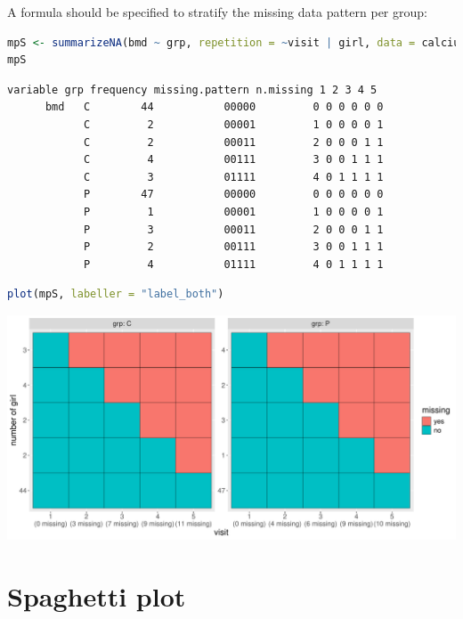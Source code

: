 \documentclass[12pt]{article}
\begin{document}
\clearpage

A formula should be specified to stratify the missing data pattern per group:
\begin{lstlisting}[language=r,numbers=none]
mpS <- summarizeNA(bmd ~ grp, repetition = ~visit | girl, data = calciumL)
mpS
\end{lstlisting}

\label{}
\begin{verbatim}
variable grp frequency missing.pattern n.missing 1 2 3 4 5
      bmd   C        44           00000         0 0 0 0 0 0
            C         2           00001         1 0 0 0 0 1
            C         2           00011         2 0 0 0 1 1
            C         4           00111         3 0 0 1 1 1
            C         3           01111         4 0 1 1 1 1
            P        47           00000         0 0 0 0 0 0
            P         1           00001         1 0 0 0 0 1
            P         3           00011         2 0 0 0 1 1
            P         2           00111         3 0 0 1 1 1
            P         4           01111         4 0 1 1 1 1
\end{verbatim}

\begin{lstlisting}[language=r,numbers=none]
plot(mpS, labeller = "label_both")
\end{lstlisting}

\begin{center}
\includegraphics[trim={0 0 0 0},width=1\textwidth]{./figures/summarizeNA-stratified.pdf}
\end{center}



\clearpage
\section{Spaghetti plot}
\label{sec:orgc9cbfa4}
\end{document}
